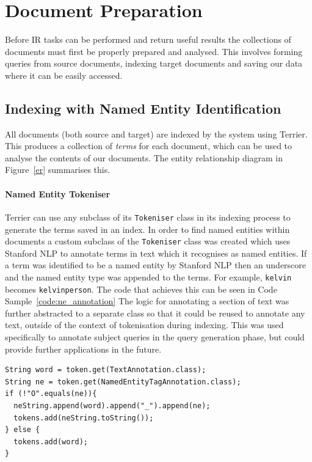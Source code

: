 \documentclass{l4proj}
\newcommand{\code}[1]{\texttt{#1}}
\newenvironment{codelisting}{\captionsetup{type=listing}}{}
\begin{document}
\section{Document Preparation}
Before IR tasks can be performed and return useful results the collections of documents must first be properly prepared and analysed. This involves forming queries from source documents, indexing target documents and saving our data where it can be easily accessed.

\subsection{Indexing with Named Entity Identification} \label{nertok}
All documents (both source and target) are indexed by the system using Terrier. This produces a collection of \textit{terms} for each document, which can be used to analyse the contents of our documents. The entity relationship diagram in Figure~\ref{er} summarises this.

\paragraph{Named Entity Tokeniser}
Terrier can use any subclass of its \code{Tokeniser} class in its indexing process to generate the terms saved in an index. In order to find named entities within documents a custom subclass of the \code{Tokeniser} class was created which uses Stanford NLP to annotate terms in text which it recognises as named entities.
If a term was identified to be a named entity by Stanford NLP then an underscore and the named entity type was appended to the terms. For example, 
\code{kelvin} becomes \code{kelvin\textunderscore person}. The code that achieves this can be seen in Code Sample~\ref{code:ne_annotation}
The logic for annotating a section of text was further abstracted to a separate class so that it could be reused to annotate any text, outside of the context of tokenisation during indexing. This was used specifically to annotate subject queries in the query generation phase, but could provide further applications in the future.
\begin{codelisting}
\begin{verbatim}
String word = token.get(TextAnnotation.class);
String ne = token.get(NamedEntityTagAnnotation.class);
if (!"O".equals(ne)){
  neString.append(word).append("_").append(ne);
  tokens.add(neString.toString());
} else {
  tokens.add(word);
}
\end{verbatim}
\label{code:ne_annotation}
\end{codelisting}
\end{document}
